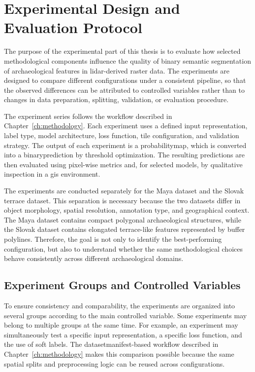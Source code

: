 
\chapter{Experimental Design and Evaluation Protocol}\label{ch:design_protocol}

The purpose of the experimental part of this thesis is to evaluate how selected methodological components influence the quality of binary semantic segmentation of archaeological features in \gls{lidar}-derived raster data. The experiments are designed to compare different configurations under a consistent pipeline, so that the observed differences can be attributed to controlled variables rather than to changes in data preparation, splitting, validation, or evaluation procedure.

The experiment series follows the workflow described in Chapter~\ref{ch:methodology}. Each experiment uses a defined input representation, label type, model architecture, loss function, tile configuration, and validation strategy. The output of each experiment is a \gls{probabilitymap}, which is converted into a \gls{binaryprediction} by threshold optimization. The resulting predictions are then evaluated using pixel-wise metrics and, for selected models, by qualitative inspection in a \gls{gis} environment.

The experiments are conducted separately for the Maya dataset and the Slovak terrace dataset. This separation is necessary because the two datasets differ in object morphology, spatial resolution, annotation type, and geographical context. The Maya dataset contains compact polygonal archaeological structures, while the Slovak dataset contains elongated terrace-like features represented by \gls{buffer} polylines. Therefore, the goal is not only to identify the best-performing configuration, but also to understand whether the same methodological choices behave consistently across different archaeological domains.

\section{Experiment Groups and Controlled Variables}

To ensure consistency and comparability, the experiments are organized into several groups according to the main controlled variable. Some experiments may belong to multiple groups at the same time. For example, an experiment may simultaneously test a specific input representation, a specific loss function, and the use of soft labels. The \gls{datasetmanifest}-based workflow described in Chapter~\ref{ch:methodology} makes this comparison possible because the same spatial splits and preprocessing logic can be reused across configurations.

